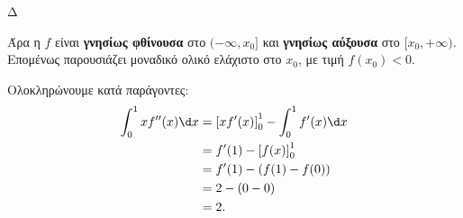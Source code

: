 \begin{thema}{Δ}
\begin{erwthma}
Άρα η $f$ είναι \textbf{γνησίως φθίνουσα} στο $(-\infty,x_0]$ και \textbf{γνησίως αύξουσα} στο $[x_0,+\infty)$. Επομένως παρουσιάζει μοναδικό ολικό ελάχιστο στο $x_0$, με τιμή $f(x_0)<0$.

\item Ολοκληρώνουμε κατά παράγοντες:
\begin{align*}
\int_0^1 xf''(x)\d x
&=\left[xf'(x)\right]_0^1-\int_0^1f'(x)\d x\\
&=f'(1)-\left[f(x)\right]_0^1\\
&=f'(1)-\left(f(1)-f(0)\right)\\
&=2-(0-0)\\
&={2}.
\end{align*}
\end{erwthma}
\end{thema}

